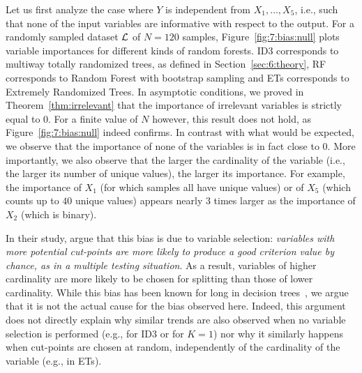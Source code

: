 Let us first analyze the case where $Y$ is independent from $X_1, \dots, X_5$,
i.e., such that none of the input variables are informative with respect to the
output. For a randomly sampled dataset ${\cal L}$ of $N=120$ samples,
Figure~\ref{fig:7:bias:null} plots variable importances for different kinds of
random forests. ID3 corresponds to multiway totally randomized trees, as
defined in Section~\ref{sec:6:theory}, RF corresponds to Random Forest with
bootstrap sampling and ETs corresponds to Extremely Randomized Trees. In
asymptotic conditions, we proved in Theorem~\ref{thm:irrelevant} that the
importance of irrelevant variables is strictly equal to $0$. For a finite value
of $N$ however, this result does not hold, as Figure~\ref{fig:7:bias:null}
indeed confirms. In contrast with what would be expected, we observe that the
importance of none of the variables is in fact close to $0$. More importantly,
we also observe that the larger the cardinality of the variable (i.e., the
larger its number of unique values), the larger its importance. For example,
the importance of $X_1$ (for which samples all have unique values) or of $X_5$
(which counts up to $40$ unique values) appears nearly $3$ times larger as the
importance of $X_2$ (which is binary).

In their study, \citet{strobl:2007b} argue that this bias is due to variable
selection: \textit{variables with more potential cut-points are more likely to
produce a good criterion value by chance, as in a multiple testing situation}.
As a result, variables of higher cardinality are more likely to be chosen for
splitting than those of lower cardinality. While this bias has been known for
long in decision trees~\citep{kononenko:1995,kim:2001,hothorn:2006}, we argue
that it is not the actual cause for the bias observed here. Indeed, this
argument does not directly explain why similar trends are also observed when no
variable selection is performed (e.g., for ID3 or for $K=1$) nor why it
similarly happens when cut-points are chosen at random, independently of the
cardinality of the variable (e.g., in ETs).

